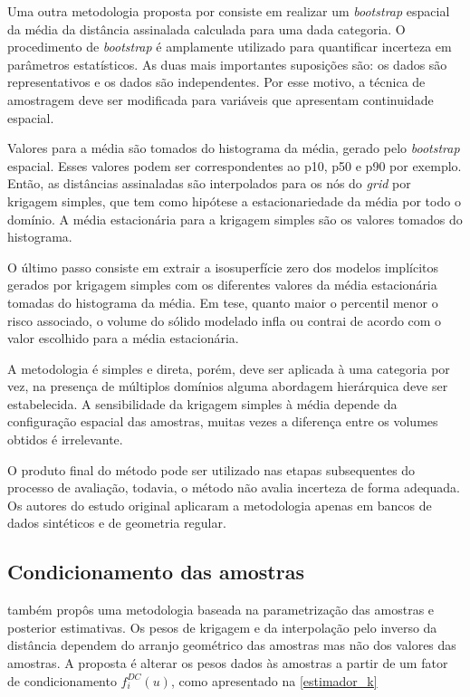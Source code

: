 Uma outra metodologia proposta por  consiste em realizar um \textit{bootstrap} espacial \cite{deutsh_spatial_bootstrap} da média da distância assinalada calculada para uma dada categoria. O procedimento de \textit{bootstrap} é amplamente utilizado para quantificar incerteza em parâmetros estatísticos. As duas mais importantes suposições são: os dados são representativos e os dados são independentes. Por esse motivo, a técnica de amostragem deve ser modificada para variáveis que apresentam continuidade espacial. 

Valores para a média são tomados do histograma da média, gerado pelo \textit{bootstrap} espacial. Esses valores podem ser correspondentes ao p10, p50 e p90 por exemplo. Então, as distâncias assinaladas são interpolados para os nós do \textit{grid} por krigagem simples, que tem como hipótese a estacionariedade da média por todo o domínio. A média estacionária para a krigagem simples são os valores tomados do histograma.

O último passo consiste em extrair a isosuperfície zero dos modelos implícitos gerados por krigagem simples com os diferentes valores da média estacionária tomadas do histograma da média. Em tese, quanto maior o percentil menor o risco associado, o volume do sólido modelado infla ou contrai de acordo com o valor escolhido para a média estacionária.

A metodologia é simples e direta, porém, deve ser aplicada à uma categoria por vez, na presença de múltiplos domínios alguma abordagem hierárquica deve ser estabelecida. A sensibilidade da krigagem simples à média depende da configuração espacial das amostras, muitas vezes a diferença entre os volumes obtidos é irrelevante.

O produto final do método pode ser utilizado nas etapas subsequentes do processo de avaliação, todavia, o método não avalia incerteza de forma adequada. Os autores do estudo original aplicaram a metodologia apenas em bancos de dados sintéticos e de geometria regular. 

\subsection{Condicionamento das amostras}\label{chap:cond_amo}

 também propôs uma metodologia baseada na parametrização das amostras e posterior estimativas. Os pesos de krigagem e da interpolação pelo inverso da distância dependem do arranjo geométrico das amostras mas não dos valores das amostras. A proposta é alterar os pesos dados às amostras a partir de um fator de condicionamento $f^{DC}_i(u)$, como apresentado na \autoref{estimador_k}

